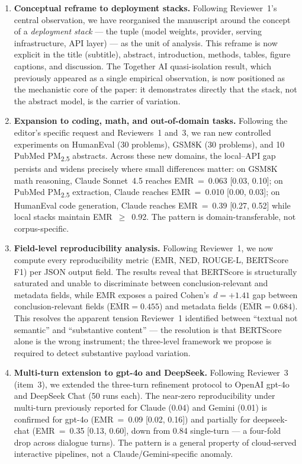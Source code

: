 \documentclass[11pt,a4paper]{article}
\begin{document}
\begin{enumerate}[leftmargin=*]
  \item \textbf{Conceptual reframe to deployment stacks.} Following Reviewer~1's central observation, we have reorganised the manuscript around the concept of a \emph{deployment stack} --- the tuple (model weights, provider, serving infrastructure, API layer) --- as the unit of analysis. This reframe is now explicit in the title (subtitle), abstract, introduction, methods, tables, figure captions, and discussion. The Together AI quasi-isolation result, which previously appeared as a single empirical observation, is now positioned as the mechanistic core of the paper: it demonstrates directly that the stack, not the abstract model, is the carrier of variation.
  \item \textbf{Expansion to coding, math, and out-of-domain tasks.} Following the editor's specific request and Reviewers~1 and~3, we ran new controlled experiments on HumanEval (30 problems), GSM8K (30 problems), and 10 PubMed PM\textsubscript{2.5} abstracts. Across these new domains, the local--API gap persists and widens precisely where small differences matter: on GSM8K math reasoning, Claude Sonnet~4.5 reaches EMR~=~0.063 [0.03, 0.10]; on PubMed PM\textsubscript{2.5} extraction, Claude reaches EMR~=~0.010 [0.00, 0.03]; on HumanEval code generation, Claude reaches EMR~=~0.39 [0.27, 0.52] while local stacks maintain EMR~$\geq$~0.92. The pattern is domain-transferable, not corpus-specific.
  \item \textbf{Field-level reproducibility analysis.} Following Reviewer~1, we now compute every reproducibility metric (EMR, NED, ROUGE-L, BERTScore F1) per JSON output field. The results reveal that BERTScore is structurally saturated and unable to discriminate between conclusion-relevant and metadata fields, while EMR exposes a paired Cohen's~$d=+1.41$ gap between conclusion-relevant fields ($\overline{\text{EMR}}=0.455$) and metadata fields ($\overline{\text{EMR}}=0.684$). This resolves the apparent tension Reviewer~1 identified between ``textual not semantic'' and ``substantive content'' --- the resolution is that BERTScore alone is the wrong instrument; the three-level framework we propose is required to detect substantive payload variation.
  \item \textbf{Multi-turn extension to gpt-4o and DeepSeek.} Following Reviewer~3 (item~3), we extended the three-turn refinement protocol to OpenAI gpt-4o and DeepSeek Chat (50 runs each). The near-zero reproducibility under multi-turn previously reported for Claude (0.04) and Gemini (0.01) is confirmed for gpt-4o (EMR~=~0.09 [0.02, 0.16]) and partially for deepseek-chat (EMR~=~0.35 [0.13, 0.60], down from 0.84 single-turn --- a four-fold drop across dialogue turns). The pattern is a general property of cloud-served interactive pipelines, not a Claude/Gemini-specific anomaly.

\end{enumerate}
\end{document}
